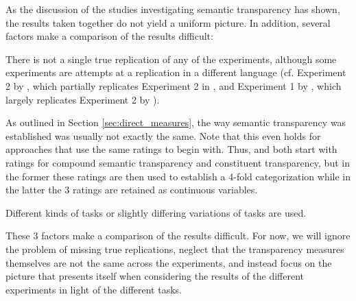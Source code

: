 As the discussion of the studies investigating semantic transparency
has shown, the results taken together do not yield a uniform
picture. In addition, several factors make a comparison of the results
difficult:
\begin{inparaenum}[(1)]
\item There is not a single true replication of any of the
experiments, although some experiments are attempts at a replication
in a different language (cf. Experiment 2 by \citealt{Jaremaetal:1999},
which partially replicates Experiment 2 in \citealt{Libbenetal:2003}, and
Experiment 1 by \citealt{Frissonetal:2008}, which largely replicates
Experiment 2 by \citealt{PollatsekandHyona:2005}).
\item As outlined in Section \ref{sec:direct_measures}, the way
  semantic transparency was established was usually not exactly the
  same. Note that this even holds for approaches that use the same
  ratings to begin with. Thus, \citet{Libbenetal:2003} and
  \citet{MarelliandLuzzatti:2012} both start with ratings
  for compound semantic transparency and constituent transparency, but in the former these ratings are then used to establish
  a 4-fold categorization while in the latter the 3 ratings are
  retained as continuous variables.
\item Different kinds of tasks or slightly differing variations of
  tasks are used.
\end{inparaenum}

These 3 factors make a comparison of the results
difficult. For now, we will ignore the problem of missing true replications,
 neglect that the transparency measures themselves are not the
same across the experiments, and instead focus on the picture that
presents itself when considering the results of the different
experiments in light of the different tasks.

